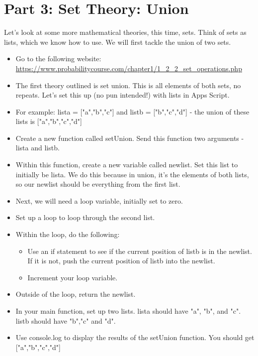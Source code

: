 \documentclass{article}
\begin{document}
\section*{Part 3: Set Theory: Union}
Let's look at some more mathematical theories, this time, sets.  Think of sets as lists, which we know how to use.  We will first tackle the union of two sets.
\begin{itemize}
    \item Go to the following website:  \url{https://www.probabilitycourse.com/chapter1/1_2_2_set_operations.php}
    \item The first theory outlined is set union.  This is all elements of both sets, no repeats.  Let's set this up (no pun intended!) with lists in Apps Script.
    \item For example:  lista = ["a","b","c"] and listb = ["b","c","d"] - the union of these lists is ["a","b","c","d"]
    \item Create a new function called setUnion.  Send this function two arguments - lista and listb.
    \item Within this function, create a new variable called newlist.  Set this list to initially be lista.  We do this because in union, it's the elements of both lists, so our newlist should be everything from the first list.
    \item Next, we will need a loop variable, initially set to zero.
    \item Set up a loop to loop through the second list.
    \item Within the loop, do the following:
    \begin{itemize}
    		\item Use an if statement to see if the current position of listb is in the newlist.  If it is not, push the current position of listb into the newlist.
    		\item Increment your loop variable.
    	\end{itemize} 
    	\item Outside of the loop, return the newlist.
    	\item In your main function, set up two lists.  lista should have "a", "b", and "c". listb should have "b","c" and "d".
    	\item Use console.log to display the results of the setUnion function.  You should get ["a","b","c","d"]  
\end{itemize}
\end{document}
